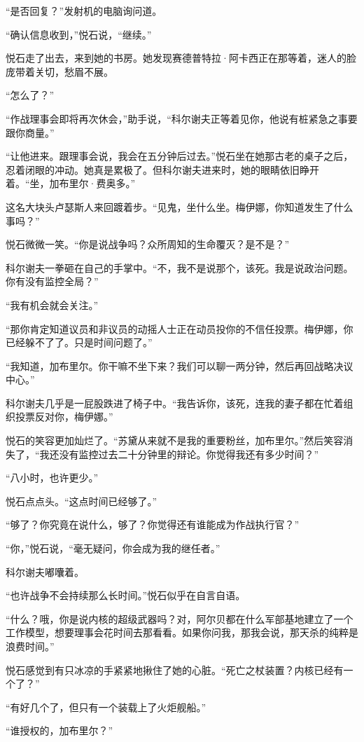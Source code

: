 \documentclass[AutoFakeBold=true]{book}
\begin{document}
``是否回复？''发射机的电脑询问道。

``确认信息收到，''悦石说，``继续。''

悦石走了出去，来到她的书房。她发现赛德普特拉·阿卡西正在那等着，迷人的脸庞带着关切，愁眉不展。

``怎么了？''

``作战理事会即将再次休会，''助手说，``科尔谢夫正等着见你，他说有桩紧急之事要跟你商量。''

``让他进来。跟理事会说，我会在五分钟后过去。''悦石坐在她那古老的桌子之后，忍着闭眼的冲动。她真是累极了。但科尔谢夫进来时，她的眼睛依旧睁开着。``坐，加布里尔·费奥多。''

这名大块头卢瑟斯人来回踱着步。``见鬼，坐什么坐。梅伊娜，你知道发生了什么事吗？''

悦石微微一笑。``你是说战争吗？众所周知的生命覆灭？是不是？''

科尔谢夫一拳砸在自己的手掌中。``不，我不是说那个，该死。我是说政治问题。你有没有监控全局？''

``我有机会就会关注。''

``那你肯定知道议员和非议员的动摇人士正在动员投你的不信任投票。梅伊娜，你已经躲不了了。只是时间问题了。''

``我知道，加布里尔。你干嘛不坐下来？我们可以聊一两分钟，然后再回战略决议中心。''

科尔谢夫几乎是一屁股跌进了椅子中。``我告诉你，该死，连我的妻子都在忙着组织投票反对你，梅伊娜。''

悦石的笑容更加灿烂了。``苏黛从来就不是我的重要粉丝，加布里尔。''然后笑容消失了，``我还没有监控过去二十分钟里的辩论。你觉得我还有多少时间？''

``八小时，也许更少。''

悦石点点头。``这点时间已经够了。''

``够了？你究竟在说什么，够了？你觉得还有谁能成为作战执行官？''

``你，''悦石说，``毫无疑问，你会成为我的继任者。''

科尔谢夫嘟囔着。

``也许战争不会持续那么长时间。''悦石似乎在自言自语。

``什么？哦，你是说内核的超级武器吗？对，阿尔贝都在什么军部基地建立了一个工作模型，想要理事会花时间去那看看。如果你问我，那我会说，那天杀的纯粹是浪费时间。''

悦石感觉到有只冰凉的手紧紧地揪住了她的心脏。``死亡之杖装置？内核已经有一个了？''

``有好几个了，但只有一个装载上了火炬舰船。''

``谁授权的，加布里尔？''
\end{document}
